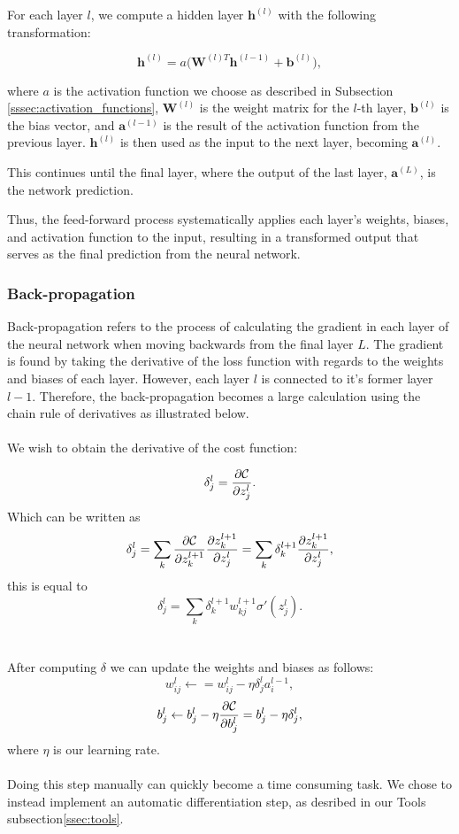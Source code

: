 For each layer \( l \), we compute a hidden layer \( \mathbf{h}^{(l)} \) with the following transformation:

\begin{equation}\label{eq:ffnn}
    \mathbf{h}^{(l)} = a \Big( \mathbf{W}^{(l)T} \mathbf{h}^{(l-1)} + \mathbf{b}^{(l)} \Big) ,
\end{equation}

where \( a \) is the activation function we choose as described in Subsection \ref{sssec:activation_functions}, 
\( \mathbf{W}^{(l)} \) is the weight matrix for the \( l \)-th layer, \( \mathbf{b}^{(l)} \) is the bias vector, 
and \( \mathbf{a}^{(l-1)} \) is the result of the activation function from the previous layer. 
\( \mathbf{h}^{(l)} \) is then used as the input to the next layer, becoming \( \mathbf{a}^{(l)} \).

This continues until the final layer, where the output of the last layer,
 \( \mathbf{a}^{(L)} \), is the network prediction. 

Thus, the feed-forward process systematically applies each layer’s weights, biases, and activation function 
to the input, resulting in a transformed output that serves as the final prediction from the neural network.

\subsubsection{Back-propagation}\label{sssec:backpropagation}

Back-propagation refers to the process of calculating the gradient in each layer of the neural network when
moving backwards from the final layer $L$. The gradient is found by taking the derivative of the 
loss function with regards to the weights and biases of each layer. However, each layer $l$ is connected to
it's former layer $l-1$. Therefore, the back-propagation becomes a large calculation using the chain rule of 
derivatives as illustrated below.
\\
\\
We wish to obtain the derivative of the cost function: 

$$
\delta_j^l =\frac{\partial {\cal C}}{\partial z_j^l}.
$$
%
Which can be written as
$$
\delta_j^l =\sum_k \frac{\partial {\cal C}}{\partial z_k^{l+1}}\frac{\partial z_k^{l+1}}{\partial z_j^{l}}=\sum_k \delta_k^{l+1}\frac{\partial z_k^{l+1}}{\partial z_j^{l}},
$$
this is equal to
$$
\delta_j^l =\sum_k \delta_k^{l+1}w_{kj}^{l+1}\sigma'(z_j^l).
$$
\\
\\
After computing $\delta$ we can update the weights and biases as follows:
$$
w_{ij}^l\leftarrow  = w_{ij}^l- \eta \delta_j^la_i^{l-1},
$$
$$
b_j^l \leftarrow b_j^l-\eta \frac{\partial {\cal C}}{\partial b_j^l}=b_j^l-\eta \delta_j^l,
$$
%
where $\eta$ is our learning rate.
\\
\\
Doing this step manually can quickly become a time consuming task. We chose to instead implement an automatic 
differentiation step, as desribed in our Tools subsection\ref{ssec:tools}.



